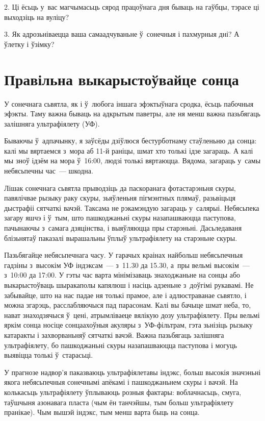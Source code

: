 2. Ці ёсьць у~вас магчымасьць сярод працоўнага дня бываць на гаўбцы, тэрасе ці выходзіць на вуліцу?

3. Як адрозьніваецца ваша самаадчуваньне ў~сонечныя і пахмурныя дні? А ўлетку і ўзімку?


\section{Правільна выкарыстоўвайце сонца}

У сонечнага сьвятла, як і ў~любога іншага эфэктыўнага сродка, ёсьць пабочныя эфэкты. Таму важна бываць на адкрытым паветры, але ня менш важна пазьбягаць залішняга ультрафіялету (УФ).

Бываючы ў~адпачынку, я заўсёды дзіўлюся бестурботнаму стаўленьню да сонца: калі мы вяртаемся з~мора аб 11-й раніцы, шмат хто толькі ідзе загараць. А калі мы зноў ідзём на мора ў~16:00, людзі толькі вяртаюцца. Вядома, загараць у~самы небясьпечны час~--- шкодна.

Лішак сонечнага сьвятла прыводзіць да паскоранага фотастарэньня скуры, павялічвае рызыку раку скуры, зьяўленьня пігмэнтных плямаў, разьвіцьця дыстрафіі сятчаткі вачэй. Таксама не рэкамэндую загараць у~салярыі. Небясьпека загару яшчэ і ў~тым, што пашкоджаньні скуры назапашваюцца паступова, пачынаючы з~самага дзяцінства, і выяўляюцца пры старэньні. Дасьледаваня блізьнятаў паказалі вырашальны ўплыў ультрафіялету на старэньне скуры.

Пазьбягайце небясьпечнага часу. У гарачых краінах найбольш небясьпечныя гадзіны з~высокім УФ індэксам~--- з~11.30 да 15.30, а~пры вельмі высокім~--- з~10:00 да 17:00. У гэты час варта мінімізаваць знаходжаньне на сонцы або выкарыстоўваць шыракаполы капялюш і насіць адзеньне з~доўгімі рукавамі. Не забывайце, што на нас падае ня толькі прамое, але і адлюстраванае сьвятло, і можна згарэць, расслабляючыся пад парасонам. Калі вы бачыце шмат неба, то, нават знаходзячыся ў~цені, атрымліваеце вялікую дозу ультрафіялету. Пры вельмі яркім сонца носіце сонцаахоўныя акуляры з~УФ-фільтрам, гэта зьнізіць рызыку катаракты і захворваньняў сятчаткі вачэй. Важна пазьбягаць залішняга ультрафіялету, бо пашкоджаньні скуры назапашваюцца паступова і могуць выявіцца толькі ў~старасьці.

У прагнозе надвор'я паказваюць ультрафіялетавы індэкс, больш высокія значэньні якога небясьпечныя сонечнымі апёкамі і пашкоджаньнем скуры і вачэй. На колькасьць ультрафіялету ўплываюць розныя фактары: воблачнасьць, смуга, таўшчыня азонавага пласта (чым ён танчэйшы, тым больш ультрафіялету пранікае). Чым вышэй індэкс, тым менш варта быць на сонца.


